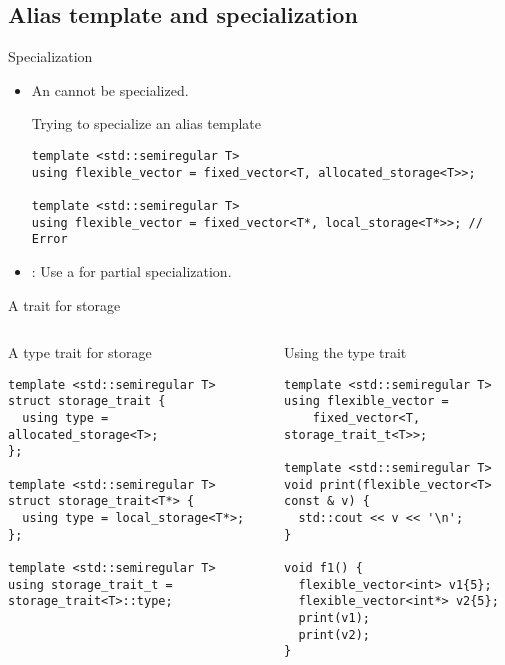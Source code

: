 \subsection{Alias template and specialization}

\begin{frame}[t,fragile]{Specialization}
\begin{itemize}
  \item An  cannot be specialized.

\begin{block}{Trying to specialize an alias template}
\begin{lstlisting}
template <std::semiregular T>
using flexible_vector = fixed_vector<T, allocated_storage<T>>;

template <std::semiregular T>
using flexible_vector = fixed_vector<T*, local_storage<T*>>; // Error  
\end{lstlisting}
\end{block}

  \item {}: Use a  for partial specialization.

\end{itemize}
\end{frame}

\begin{frame}[t,fragile]{A trait for storage}
\begin{columns}[T]

\begin{block}{A type trait for storage}
\begin{lstlisting}
template <std::semiregular T>
struct storage_trait {
  using type = allocated_storage<T>;
};

template <std::semiregular T>
struct storage_trait<T*> {
  using type = local_storage<T*>;
};

template <std::semiregular T>
using storage_trait_t = storage_trait<T>::type;
\end{lstlisting}
\end{block}

\pause
{}
\begin{block}{Using the type trait}
\begin{lstlisting}
template <std::semiregular T>
using flexible_vector = 
    fixed_vector<T, storage_trait_t<T>>;

template <std::semiregular T>
void print(flexible_vector<T> const & v) {
  std::cout << v << '\n';
}

void f1() {
  flexible_vector<int> v1{5};
  flexible_vector<int*> v2{5};
  print(v1);
  print(v2);
}
\end{lstlisting}	
\end{block}

\end{columns}

\end{frame}
